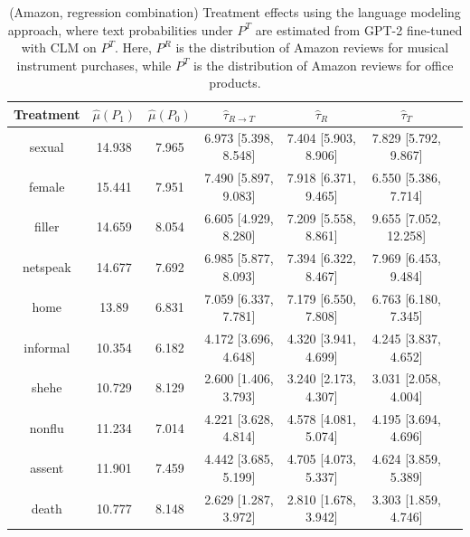 \documentclass{article}
\begin{document}
\begin{table}[!ht]
\centering
\begin{tabular}{c|cccccc}
\toprule
    Treatment   &   $\hat{\mu}(P_1)$ &   $\hat{\mu}(P_0)$ & $\hat{\tau}_{R \rightarrow T}$   & $\hat{\tau}_R$       & $\hat{\tau}_T$        \\
\midrule
    sexual      &             14.938 &              7.965 & 6.973 [5.398, 8.548]             & 7.404 [5.903, 8.906] & 7.829 [5.792, 9.867]  \\
    female      &             15.441 &              7.951 & 7.490 [5.897, 9.083]             & 7.918 [6.371, 9.465] & 6.550 [5.386, 7.714]  \\
    filler      &             14.659 &              8.054 & 6.605 [4.929, 8.280]             & 7.209 [5.558, 8.861] & 9.655 [7.052, 12.258] \\
    netspeak    &             14.677 &              7.692 & 6.985 [5.877, 8.093]             & 7.394 [6.322, 8.467] & 7.969 [6.453, 9.484]  \\
    home        &             13.89  &              6.831 & 7.059 [6.337, 7.781]             & 7.179 [6.550, 7.808] & 6.763 [6.180, 7.345]  \\
    informal    &             10.354 &              6.182 & 4.172 [3.696, 4.648]             & 4.320 [3.941, 4.699] & 4.245 [3.837, 4.652]  \\
    shehe       &             10.729 &              8.129 & 2.600 [1.406, 3.793]             & 3.240 [2.173, 4.307] & 3.031 [2.058, 4.004]  \\
    nonflu      &             11.234 &              7.014 & 4.221 [3.628, 4.814]             & 4.578 [4.081, 5.074] & 4.195 [3.694, 4.696]  \\
    assent      &             11.901 &              7.459 & 4.442 [3.685, 5.199]             & 4.705 [4.073, 5.337] & 4.624 [3.859, 5.389]  \\
    death       &             10.777 &              8.148 & 2.629 [1.287, 3.972]             & 2.810 [1.678, 3.942] & 3.303 [1.859, 4.746]  \\
\bottomrule
\end{tabular}
\caption{(Amazon, regression combination) Treatment effects using the language modeling approach, where text probabilities under $P^T$ are estimated from GPT-2 fine-tuned with CLM on $P^T$. Here, $P^R$ is the distribution of Amazon reviews for musical instrument purchases, while $P^T$ is the distribution of Amazon reviews for office products.}
\label{tab:results_clm_gpt2_amazon_synthetic_predreg_finetuned_pt}
\end{table}
\end{document}
